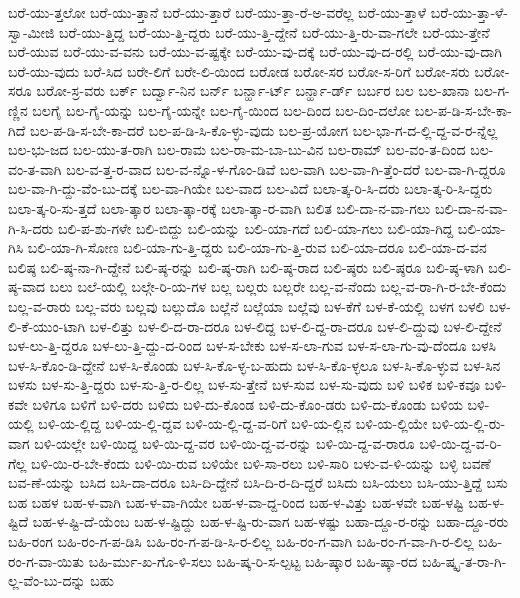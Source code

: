 {ಬರೆ-ಯು-ತ್ತಲೋ
ಬರೆ-ಯು-ತ್ತಾನೆ
ಬರೆ-ಯು-ತ್ತಾರೆ
ಬರೆ-ಯು-ತ್ತಾ-ರೆ-ಅ-ವರೆಲ್ಲ
ಬರೆ-ಯು-ತ್ತಾಳೆ
ಬರೆ-ಯು-ತ್ತಾ-ಳೆ-ಸ್ವಾ-ಮೀಜಿ
ಬರೆ-ಯು-ತ್ತಿದ್ದ
ಬರೆ-ಯು-ತ್ತಿ-ದ್ದರು
ಬರೆ-ಯು-ತ್ತಿ-ದ್ದೇನೆ
ಬರೆ-ಯು-ತ್ತಿ-ರು-ವಾ-ಗಲೇ
ಬರೆ-ಯು-ತ್ತೇನೆ
ಬರೆ-ಯುವ
ಬರೆ-ಯು-ವ-ವನು
ಬರೆ-ಯು-ವ-ಷ್ಟಕ್ಕೇ
ಬರೆ-ಯು-ವು-ದಕ್ಕೆ
ಬರೆ-ಯು-ವು-ದ-ರಲ್ಲಿ
ಬರೆ-ಯು-ವು-ದಾಗಿ
ಬರೆ-ಯು-ವುದು
ಬರೆ-ಸಿದ
ಬರೇ-ಲಿಗೆ
ಬರೇ-ಲಿ-ಯಿಂದ
ಬರೋಡ
ಬರೋ-ಸರ
ಬರೋ-ಸ-ರಿಗೆ
ಬರೋ-ಸರು
ಬರೋ-ಸರೂ
ಬರೋ-ಸ್ರ-ವರು
ಬರ್ಕ್
ಬರ್ದ್ವಾ-ನಿನ
ಬರ್ನ್
ಬರ್ನ್ಹಾ-ರ್ಟ್
ಬರ್ನ್ಹಾ-ರ್ಡ್
ಬರ್ಬರ
ಬಲ
ಬಲ-ಖಾನಾ
ಬಲ-ಗ-ಣ್ಣಿನ
ಬಲಗೈ
ಬಲ-ಗೈ-ಯನ್ನು
ಬಲ-ಗೈ-ಯನ್ನೇ
ಬಲ-ಗೈ-ಯಿಂದ
ಬಲ-ದಿಂದ
ಬಲ-ದಿಂ-ದಲೋ
ಬಲ-ಪ-ಡಿ-ಸ-ಬೇ-ಕಾ-ಗಿದೆ
ಬಲ-ಪ-ಡಿ-ಸ-ಬೇ-ಕಾ-ದರೆ
ಬಲ-ಪ-ಡಿ-ಸಿ-ಕೊ-ಳ್ಳು-ವುದು
ಬಲ-ಪ್ರ-ಯೋಗ
ಬಲ-ಭಾ-ಗ-ದ-ಲ್ಲಿ-ದ್ದ-ವ-ರ-ನ್ನೆಲ್ಲ
ಬಲ-ಭು-ಜದ
ಬಲ-ಯು-ತ-ರಾಗಿ
ಬಲ-ರಾಮ
ಬಲ-ರಾ-ಮ-ಬಾ-ಬು-ವಿನ
ಬಲ-ರಾಮ್
ಬಲ-ವಂ-ತ-ದಿಂದ
ಬಲ-ವಂ-ತ-ವಾಗಿ
ಬಲ-ವ-ತ್ತ-ರ-ವಾದ
ಬಲ-ವ-ನ್ನೊ-ಳ-ಗೊಂ-ಡಿವೆ
ಬಲ-ವಾಗಿ
ಬಲ-ವಾ-ಗಿ-ತ್ತೆಂ-ದರೆ
ಬಲ-ವಾ-ಗಿ-ದ್ದರೂ
ಬಲ-ವಾ-ಗಿ-ದ್ದು-ವೆಂ-ಬು-ದಕ್ಕೆ
ಬಲ-ವಾ-ಗಿಯೇ
ಬಲ-ವಾದ
ಬಲ-ವಿದೆ
ಬಲಾ-ತ್ಕ-ರಿ-ಸಿ-ದರು
ಬಲಾ-ತ್ಕ-ರಿ-ಸಿ-ದ್ದರು
ಬಲಾ-ತ್ಕ-ರಿ-ಸು-ತ್ತದೆ
ಬಲಾ-ತ್ಕಾರ
ಬಲಾ-ತ್ಕಾ-ರಕ್ಕೆ
ಬಲಾ-ತ್ಕಾ-ರ-ವಾಗಿ
ಬಲಿತ
ಬಲಿ-ದಾ-ನ-ವಾ-ಗಲು
ಬಲಿ-ದಾ-ನ-ವಾ-ಗಿ-ಸಿ-ದರು
ಬಲಿ-ಪ-ಶು-ಗಳೇ
ಬಲಿ-ಬಿದ್ದು
ಬಲಿ-ಯನ್ನು
ಬಲಿ-ಯಾ-ಗದೆ
ಬಲಿ-ಯಾ-ಗಲು
ಬಲಿ-ಯಾ-ಗಿದ್ದ
ಬಲಿ-ಯಾ-ಗಿಸಿ
ಬಲಿ-ಯಾ-ಗಿ-ಸೋಣ
ಬಲಿ-ಯಾ-ಗು-ತ್ತಿ-ದ್ದರು
ಬಲಿ-ಯಾ-ಗು-ತ್ತಿ-ರುವ
ಬಲಿ-ಯಾ-ದರೂ
ಬಲಿ-ಯಾ-ದ-ವನ
ಬಲಿಷ್ಠ
ಬಲಿ-ಷ್ಠ-ನಾ-ಗಿ-ದ್ದೇನೆ
ಬಲಿ-ಷ್ಠ-ರನ್ನು
ಬಲಿ-ಷ್ಠ-ರಾಗಿ
ಬಲಿ-ಷ್ಠ-ರಾದ
ಬಲಿ-ಷ್ಠರು
ಬಲಿ-ಷ್ಠರೂ
ಬಲಿ-ಷ್ಠ-ಳಾಗಿ
ಬಲಿ-ಷ್ಠ-ವಾದ
ಬಲು
ಬಲೆ-ಯಲ್ಲಿ
ಬಲ್ಗೇ-ರಿ-ಯ-ಗಳ
ಬಲ್ಲ
ಬಲ್ಲರು
ಬಲ್ಲರೇ
ಬಲ್ಲ-ವ-ನೆಂದು
ಬಲ್ಲ-ವ-ರಾ-ಗಿ-ರ-ಬೇ-ಕೆಂದು
ಬಲ್ಲ-ವ-ರಾರು
ಬಲ್ಲ-ವರು
ಬಲ್ಲವು
ಬಲ್ಲುದೊ
ಬಲ್ಲೆನೆ
ಬಲ್ಲೆಯಾ
ಬಲ್ಲೆವು
ಬಳ-ಕೆಗೆ
ಬಳ-ಕೆ-ಯಲ್ಲಿ
ಬಳಗ
ಬಳಲಿ
ಬಳ-ಲಿ-ಕೆ-ಯುಂ-ಟಾಗಿ
ಬಳ-ಲಿತ್ತು
ಬಳ-ಲಿ-ದ-ರಾ-ದರೂ
ಬಳ-ಲಿದ್ದ
ಬಳ-ಲಿ-ದ್ದ-ರಾ-ದರೂ
ಬಳ-ಲಿ-ದ್ದುವು
ಬಳ-ಲಿ-ದ್ದೇನೆ
ಬಳ-ಲು-ತ್ತಿ-ದ್ದರೂ
ಬಳ-ಲು-ತ್ತಿ-ದ್ದು-ದ-ರಿಂದ
ಬಳ-ಸ-ಬೇಕು
ಬಳ-ಸ-ಲಾ-ಗುವ
ಬಳ-ಸ-ಲಾ-ಗು-ವು-ದೆಂದೂ
ಬಳಸಿ
ಬಳ-ಸಿ-ಕೊಂ-ಡಿ-ದ್ದೇನೆ
ಬಳ-ಸಿ-ಕೊಂಡು
ಬಳ-ಸಿ-ಕೊ-ಳ್ಳ-ಬ-ಹುದು
ಬಳ-ಸಿ-ಕೊ-ಳ್ಳಲೂ
ಬಳ-ಸಿ-ಕೊ-ಳ್ಳುವ
ಬಳ-ಸಿನ
ಬಳಸು
ಬಳ-ಸು-ತ್ತಿ-ದ್ದರು
ಬಳ-ಸು-ತ್ತಿ-ರ-ಲಿಲ್ಲ
ಬಳ-ಸು-ತ್ತೇನೆ
ಬಳ-ಸುವ
ಬಳ-ಸು-ವುದು
ಬಳಿ
ಬಳಿಕ
ಬಳಿ-ಕವೂ
ಬಳಿ-ಕವೇ
ಬಳಿಗೂ
ಬಳಿಗೆ
ಬಳಿ-ದರು
ಬಳಿದು
ಬಳಿ-ದು-ಕೊಂಡ
ಬಳಿ-ದು-ಕೊಂ-ಡರು
ಬಳಿ-ದು-ಕೊಂಡು
ಬಳಿಯ
ಬಳಿ-ಯಲ್ಲಿ
ಬಳಿ-ಯ-ಲ್ಲಿದ್ದ
ಬಳಿ-ಯ-ಲ್ಲಿ-ದ್ದವ
ಬಳಿ-ಯ-ಲ್ಲಿ-ದ್ದ-ವ-ರಿಗೆ
ಬಳಿ-ಯ-ಲ್ಲಿನ
ಬಳಿ-ಯ-ಲ್ಲಿಯೇ
ಬಳಿ-ಯ-ಲ್ಲಿ-ರು-ವಾಗ
ಬಳಿ-ಯಲ್ಲೇ
ಬಳಿ-ಯಿದ್ದ
ಬಳಿ-ಯಿ-ದ್ದ-ವರ
ಬಳಿ-ಯಿ-ದ್ದ-ವ-ರನ್ನು
ಬಳಿ-ಯಿ-ದ್ದ-ವ-ರಾರೂ
ಬಳಿ-ಯಿ-ದ್ದ-ವ-ರಿ-ಗೆಲ್ಲ
ಬಳಿ-ಯಿ-ರ-ಬೇ-ಕೆಂದು
ಬಳಿ-ಯಿ-ರುವ
ಬಳಿಯೇ
ಬಳಿ-ಸಾ-ರಲು
ಬಳಿ-ಸಾರಿ
ಬಳು-ವ-ಳಿ-ಯನ್ನು
ಬಳ್ಳಿ
ಬವಣೆ
ಬವ-ಣೆ-ಯನ್ನು
ಬಸಿದ
ಬಸಿ-ದಾ-ದರೂ
ಬಸಿ-ದಿ-ದ್ದೇನೆ
ಬಸಿ-ದಿ-ರ-ದಿ-ದ್ದರೆ
ಬಸಿದು
ಬಸಿ-ಯಲು
ಬಸಿ-ಯು-ತ್ತಿದ್ದೆ
ಬಸು
ಬಹ
ಬಹಳ
ಬಹ-ಳ-ವಾಗಿ
ಬಹ-ಳ-ವಾ-ಗಿಯೇ
ಬಹ-ಳ-ವಾ-ದ್ದ-ರಿಂದ
ಬಹ-ಳ-ವಿತ್ತು
ಬಹ-ಳವೇ
ಬಹ-ಳಷ್ಟಿ
ಬಹ-ಳ-ಷ್ಟಿದೆ
ಬಹ-ಳ-ಷ್ಟಿ-ದೆ-ಯೆಂಬ
ಬಹ-ಳ-ಷ್ಟಿದ್ದು
ಬಹ-ಳ-ಷ್ಟಿ-ರು-ವಾಗ
ಬಹ-ಳಷ್ಟು
ಬಹಾ-ದ್ದೂ-ರ-ರನ್ನು
ಬಹಾ-ದ್ದೂ-ರರು
ಬಹಿ-ರಂಗ
ಬಹಿ-ರಂ-ಗ-ಪ-ಡಿಸಿ
ಬಹಿ-ರಂ-ಗ-ಪ-ಡಿ-ಸಿ-ರ-ಲಿಲ್ಲ
ಬಹಿ-ರಂ-ಗ-ವಾಗಿ
ಬಹಿ-ರಂ-ಗ-ವಾ-ಗಿ-ರ-ಲಿಲ್ಲ
ಬಹಿ-ರಂ-ಗ-ವಾ-ಯಿತು
ಬಹಿ-ರ್ಮು-ಖ-ಗೊ-ಳಿ-ಸಲು
ಬಹಿ-ಷ್ಕ-ರಿ-ಸ-ಲ್ಪಟ್ಟ
ಬಹಿ-ಷ್ಕಾರ
ಬಹಿ-ಷ್ಕಾ-ರದ
ಬಹಿ-ಷ್ಕೃ-ತ-ರಾ-ಗಿ-ಲ್ಲ-ವೆಂ-ಬು-ದನ್ನು
ಬಹು
}
